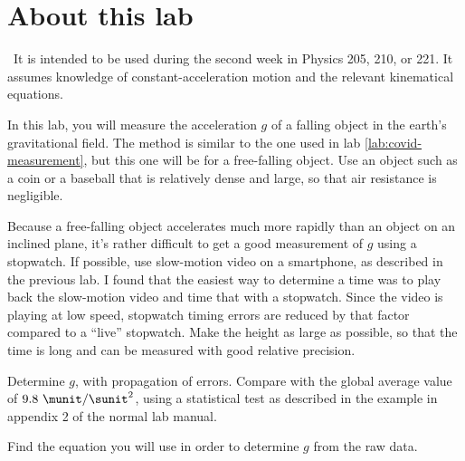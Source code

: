 \addtocounter{chapter}{-1}
\renewcommand\thechapter{c1.2a}
\label{lab:covid-g}

\section*{About this lab}

\covid\ 
It is intended to be used during the second week in Physics 205, 210, or 221.
It assumes knowledge of constant-acceleration motion and the relevant kinematical equations.

\observations

In this lab, you will measure the acceleration $g$ of a falling object in the earth's
gravitational field. The method is similar to the one used in lab \ref{lab:covid-measurement},
but this one will be for a free-falling object. Use an object such as a coin or a baseball
that is relatively dense and large, so that air resistance is negligible.

Because a free-falling object accelerates much more rapidly than an object on an inclined
plane, it's rather difficult to get a good measurement of $g$ using a stopwatch. If possible,
use slow-motion video on a smartphone, as described in the previous lab. I found that the
easiest way to determine a time was to play back the slow-motion video and time that with
a stopwatch. Since the video is playing at low speed, stopwatch timing errors are reduced
by that factor compared to a ``live'' stopwatch. Make the height as
large as possible, so that the time is long and can be measured with good relative precision.


\analysis

Determine $g$, with propagation of errors. Compare with the global average value of $9.8\ \munit/\sunit^2$,
using a statistical test as described in the example in appendix 2 of the normal lab manual.

\prelab

\prelabquestion  
Find the equation you will use in order to determine $g$ from the raw data.



